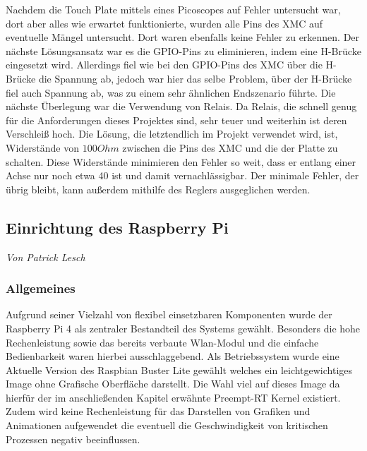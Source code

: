 \documentclass[12pt,a4paper,bibliography=totoc,listof=totoc]{scrartcl}
\begin{document}
Nachdem die Touch Plate mittels eines Picoscopes auf Fehler untersucht war, dort aber alles wie erwartet funktionierte, wurden alle Pins des XMC auf eventuelle Mängel untersucht. Dort waren ebenfalls keine Fehler zu erkennen.\newline
Der nächste Lösungsansatz war es die GPIO-Pins zu eliminieren, indem eine H-Brücke eingesetzt wird. Allerdings fiel wie bei den GPIO-Pins des XMC über die H-Brücke die Spannung ab,
jedoch war hier das selbe Problem, über der H-Brücke fiel auch Spannung ab, was zu einem sehr ähnlichen Endszenario führte. Die nächste Überlegung war die Verwendung von Relais. Da Relais, die schnell genug für die Anforderungen dieses Projektes sind, sehr teuer und weiterhin ist deren Verschleiß hoch.\newline
Die Lösung, die letztendlich im Projekt verwendet wird, ist, Widerstände von $100 Ohm$ zwischen die Pins des XMC und die der Platte zu schalten. Diese Widerstände minimieren den Fehler so weit, dass er entlang einer Achse nur noch etwa 40 ist und damit vernachlässigbar. Der minimale Fehler, der übrig bleibt, kann außerdem mithilfe des Reglers ausgeglichen werden.

\subsection{Einrichtung des Raspberry Pi}
\textit{Von Patrick Lesch}
\subsubsection{Allgemeines}
Aufgrund seiner Vielzahl von flexibel einsetzbaren Komponenten wurde der Raspberry Pi 4 als zentraler Bestandteil des Systems gewählt.
Besonders die hohe Rechenleistung sowie das bereits verbaute Wlan-Modul und die einfache Bedienbarkeit waren hierbei ausschlaggebend. 
Als Betriebssystem wurde eine Aktuelle Version des Raspbian Buster Lite gewählt welches ein leichtgewichtiges Image ohne Grafische Oberfläche darstellt.
Die Wahl viel auf dieses Image da hierfür der im anschließenden Kapitel erwähnte Preempt-RT Kernel existiert. Zudem wird keine Rechenleistung
für das Darstellen von Grafiken und Animationen aufgewendet die eventuell die Geschwindigkeit von kritischen Prozessen negativ beeinflussen.
\end{document}
